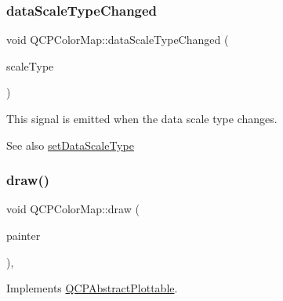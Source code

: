 \mbox{\label{class_q_c_p_color_map_a978d5d5c9f68cffef8c902b855c04490}} 
\subsubsection{\texorpdfstring{data\+Scale\+Type\+Changed}{dataScaleTypeChanged}}
{\footnotesize\ttfamily void Q\+C\+P\+Color\+Map\+::data\+Scale\+Type\+Changed (\begin{DoxyParamCaption}\item[{\hyperlink{class_q_c_p_axis_a36d8e8658dbaa179bf2aeb973db2d6f0}{Q\+C\+P\+Axis\+::\+Scale\+Type}}]{scale\+Type }\end{DoxyParamCaption})\hspace{0.3cm}{\ttfamily [signal]}}

This signal is emitted when the data scale type changes.

\begin{DoxySeeAlso}{See also}
\hyperlink{class_q_c_p_color_map_a9d20aa08e3c1f20f22908c45b9c06511}{set\+Data\+Scale\+Type} 
\end{DoxySeeAlso}
\mbox{\label{class_q_c_p_color_map_a6b628014d2939368935efd0a788648c8}} 
\subsubsection{\texorpdfstring{draw()}{draw()}}
{\footnotesize\ttfamily void Q\+C\+P\+Color\+Map\+::draw (\begin{DoxyParamCaption}\item[{\hyperlink{class_q_c_p_painter}{Q\+C\+P\+Painter} $\ast$}]{painter }\end{DoxyParamCaption})\hspace{0.3cm}{\ttfamily [protected]}, {\ttfamily [virtual]}}



Implements \hyperlink{class_q_c_p_abstract_plottable_a453f676a5cee7bf846c5f0fa05ea84b3}{Q\+C\+P\+Abstract\+Plottable}.

\mbox{\label{class_q_c_p_color_map_adeaa5e262a03b7f021bd1aa6f1e60ce9}} 
